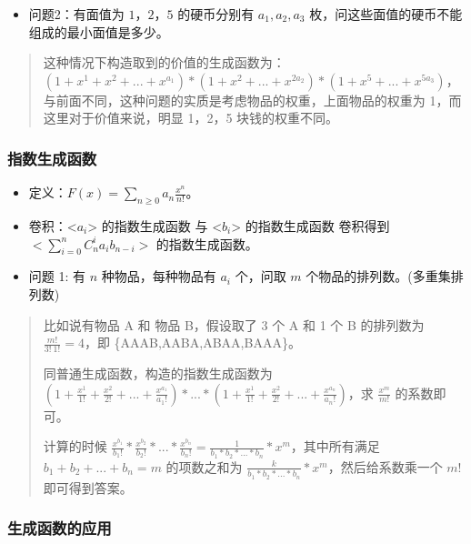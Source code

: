\documentclass[a4paper,12pt]{article}
\begin{document}
\begin{itemize}
\item
    问题2：有面值为 \(1，2，5\) 的硬币分别有 \(a_1,a_2,a_3\)
    枚，问这些面值的硬币不能组成的最小面值是多少。
\end{itemize}

\begin{quote}
这种情况下构造取到的价值的生成函数为：
\((1+x^1+x^2+...+x^{a_1})*(1+x^2+...+x^{2a_2})*(1+x^5+...+x^{5a_3})\)，与前面不同，这种问题的实质是考虑物品的权重，上面物品的权重为
1，而这里对于价值来说，明显 1，2，5 块钱的权重不同。
\end{quote}

\subsubsection{指数生成函数}

\begin{itemize}
\item
    定义：\(F(x)=\sum_{n\geq0} a_n \frac{x^n}{n!}\)。
\item
    卷积：\textless{}\(a_i\)\textgreater{} 的指数生成函数 与
    \textless{}\(b_i\)\textgreater{} 的指数生成函数 卷积得到
    \(<\sum_{i=0}^n C_n^i a_i b_{n-i}>\) 的指数生成函数。
\item
    问题 1: 有 \(n\) 种物品，每种物品有 \(a_i\) 个，问取 \(m\)
    个物品的排列数。(多重集排列数)
\end{itemize}

\begin{quote}
比如说有物品 A 和 物品 B，假设取了 3 个 A 和 1 个 B 的排列数为
\(\frac{m!}{3! \ 1!}=4\)，即 \{AAAB,AABA,ABAA,BAAA\}。

同普通生成函数，构造的指数生成函数为
\((1 + \frac{x^1}{1!} + \frac{x^2}{2!} + ... + \frac{x^{a_1}}{a_1!}) * ... * (1 + \frac{x^1}{1!} + \frac{x^2}{2!} + .. . + \frac{x^{a_n}}{a_n!})\)，求
\(\frac{x^m}{m!}\) 的系数即可。

计算的时候
\(\frac{x^{b_1}}{b_1!}*\frac{x^{b_2}}{b_2!}*...*\frac{x^{b_n}}{b_n!}=\frac{1}{b_1*b_2*...*b_n}*x^m\)，其中所有满足
\(b_1+b_2+...+b_n=m\) 的项数之和为
\(\frac{k}{b_1*b_2*...*b_n}*x^m\)，然后给系数乘一个 \(m!\)
即可得到答案。
\end{quote}

\subsubsection{生成函数的应用}
\end{document}
